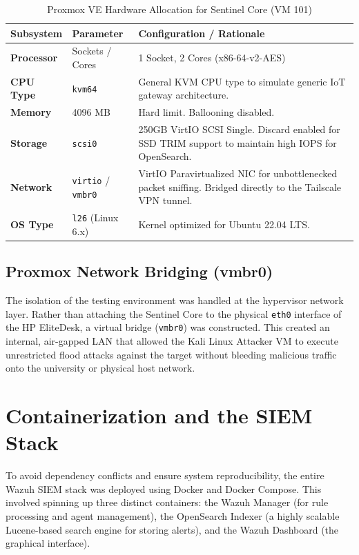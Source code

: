\documentclass[12pt, a4paper]{report}
\begin{document}
	\begin{table}[H]
		\centering
		\caption{Proxmox VE Hardware Allocation for Sentinel Core (VM 101)}
		\vspace{0.2cm}
		\begin{tabularx}{\textwidth}{|l|l|X|}
			\hline
			\textbf{Subsystem} & \textbf{Parameter} & \textbf{Configuration / Rationale} \\
			\hline
			\textbf{Processor} & Sockets / Cores & 1 Socket, 2 Cores (x86-64-v2-AES) \\
			\hline
			\textbf{CPU Type} & \texttt{kvm64} & General KVM CPU type to simulate generic IoT gateway architecture. \\
			\hline
			\textbf{Memory} & 4096 MB & Hard limit. Ballooning disabled. \\
			\hline
			\textbf{Storage} & \texttt{scsi0} & 250GB VirtIO SCSI Single. Discard enabled for SSD TRIM support to maintain high IOPS for OpenSearch. \\
			\hline
			\textbf{Network} & \texttt{virtio} / \texttt{vmbr0} & VirtIO Paravirtualized NIC for unbottlenecked packet sniffing. Bridged directly to the Tailscale VPN tunnel. \\
			\hline
			\textbf{OS Type} & \texttt{l26} (Linux 6.x) & Kernel optimized for Ubuntu 22.04 LTS. \\
			\hline
		\end{tabularx}
	\end{table}
	
	\subsection{Proxmox Network Bridging (vmbr0)}
	The isolation of the testing environment was handled at the hypervisor network layer. Rather than attaching the Sentinel Core to the physical \texttt{eth0} interface of the HP EliteDesk, a virtual bridge (\texttt{vmbr0}) was constructed. This created an internal, air-gapped LAN that allowed the Kali Linux Attacker VM to execute unrestricted flood attacks against the target without bleeding malicious traffic onto the university or physical host network.
	
	\section{Containerization and the SIEM Stack}
	To avoid dependency conflicts and ensure system reproducibility, the entire Wazuh SIEM stack was deployed using Docker and Docker Compose. This involved spinning up three distinct containers: the Wazuh Manager (for rule processing and agent management), the OpenSearch Indexer (a highly scalable Lucene-based search engine for storing alerts), and the Wazuh Dashboard (the graphical interface). 
	
\end{document}
